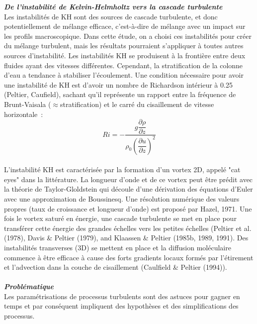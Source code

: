 \documentclass[a4paper,12pt]{article}
\begin{document}
    \newline
    \textbf{\textit{De l'instabilité de Kelvin-Helmholtz vers la cascade turbulente}} \\
    Les instabilités de KH sont des sources de cascade turbulente, et donc potentiellement de mélange efficace, c'est-à-dire de mélange avec un impact sur les profils macroscopique. Dans cette étude, on a choisi ces instabilités pour créer du mélange turbulent, mais les résultats pourraient s'appliquer à toutes autres sources d'instabilité. Les instabilités KH se produisent à la frontière entre deux fluides ayant des vitesses différentes. Cependant, la stratification de la colonne d'eau a tendance à stabiliser l'écoulement. Une condition nécessaire pour avoir une instabilité de KH est d'avoir un nombre de Richardson intérieur à 0.25 (Peltier, Caufield), sachant qu'il représente un rapport entre la fréquence de Brunt-Vaisala ($\approx$stratification) et le carré du cisaillement de vitesse horizontale : \\
    \begin{equation}
        \label{Ri}
        Ri = -\frac{g \dfrac{\partial\rho}{\partial z}}{\rho_0 (\dfrac{\partial u}{\partial z})^2}
    \end{equation}
    \\
    L'instabilité KH est caractérisée par la formation d'un vortex 2D, appelé "cat eyes" dans la littérature. La longueur d'onde et de ce vortex peut être prédit avec la théorie de Taylor-Gloldstein qui découle d'une dérivation des équations d'Euler avec une approximation de Boussinesq. Une résolution numérique des valeurs propres (taux de croissance et longueur d'onde) est proposé par Hazel, 1971. Une fois le vortex saturé en énergie, une cascade turbulente se met en place pour transférer cette énergie des grandes échelles vers les petites échelles (Peltier et al. (1978), Davis \& Peltier (1979), and Klaassen \& Peltier (1985b, 1989, 1991). Des instabilités transverses (3D) se mettent en place et la diffusion moléculaire commence à être efficace à cause des forts gradients locaux formés par l'étirement et l'advection dans la couche de cisaillement (Caulfield \& Peltier (1994)).  \\
    \\
    \newline
    \textbf{\textit{Problématique}} \\
    \color{blue}
    Les paramétrisations de processus turbulents sont des astuces pour gagner en temps et par conséquent impliquent des hypothèses et des simplifications des processus. \\
\end{document}

